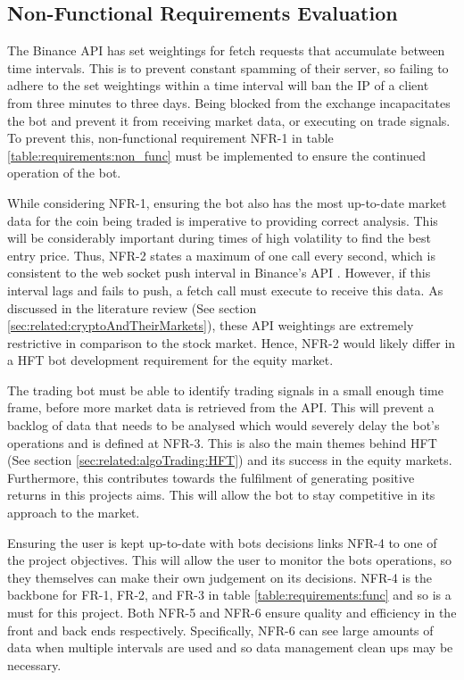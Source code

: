 \subsection{Non-Functional Requirements Evaluation}
The Binance API \cite{WEB:BINANCE_API:2018} has set weightings for fetch requests that accumulate between time intervals. This is to prevent constant spamming of their server, so failing to adhere to the set weightings within a time interval will ban the IP of a client from three minutes to three days. Being blocked from the exchange incapacitates the bot and prevent it from receiving market data, or executing on trade signals. To prevent this, non-functional requirement NFR-1 in table \ref{table:requirements:non_func} must be implemented to ensure the continued operation of the bot.

While considering NFR-1, ensuring the bot also has the most up-to-date market data for the coin being traded is imperative to providing correct analysis. This will be considerably important during times of high volatility to find the best entry price. Thus, NFR-2 states a maximum of one call every second, which is consistent to the web socket push interval in Binance's API \cite{WEB:BINANCE_API:2018}. However, if this interval lags and fails to push, a fetch call must execute to receive this data. As discussed in the literature review (See section \ref{sec:related:cryptoAndTheirMarkets}), these API weightings are extremely restrictive in comparison to the stock market. Hence, NFR-2 would likely differ in a HFT bot development requirement for the equity market. 

The trading bot must be able to identify trading signals in a small enough time frame, before more market data is retrieved from the API. This will prevent a backlog of data that needs to be analysed which would severely delay the bot's operations and is defined at NFR-3. This is also the main themes behind HFT (See section \ref{sec:related:algoTrading:HFT}) and its success in the equity markets. Furthermore, this contributes towards the fulfilment of generating positive returns in this projects aims. This will allow the bot to stay competitive in its approach to the market.

Ensuring the user is kept up-to-date with bots decisions links NFR-4 to one of the project objectives. This will allow the user to monitor the bots operations, so they themselves can make their own judgement on its decisions. NFR-4 is the backbone for FR-1, FR-2, and FR-3 in table \ref{table:requirements:func} and so is a must for this project. Both NFR-5 and NFR-6 ensure quality and efficiency in the front and back ends respectively. Specifically, NFR-6 can see large amounts of data when multiple intervals are used and so data management clean ups may be necessary.

